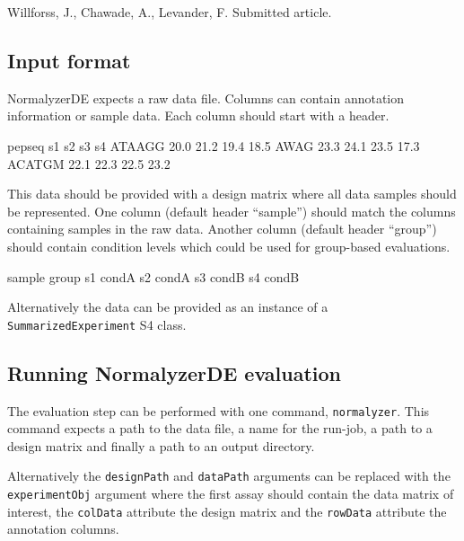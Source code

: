 \documentclass[]{article}
\renewenvironment{verbatim}{\color{codecolor}\begin{myshaded}\begin{oldverbatim}}{\end{oldverbatim}\end{myshaded}}
\begin{document}
Willforss, J., Chawade, A., Levander, F. Submitted article.

\hypertarget{input-format}{%
\subsection{Input format}\label{input-format}}

NormalyzerDE expects a raw data file. Columns can contain annotation information or sample data.
Each column should start with a header.

\begin{verbatim}
pepseq  s1      s2      s3      s4
ATAAGG  20.0    21.2    19.4    18.5
AWAG    23.3    24.1    23.5    17.3
ACATGM  22.1    22.3    22.5    23.2
\end{verbatim}

This data should be provided with a design matrix where all data samples should be represented.
One column (default header ``sample'') should match the columns containing samples in the raw data.
Another column (default header ``group'') should contain condition levels which could be used for group-based
evaluations.

\begin{verbatim}
sample  group
s1      condA
s2      condA
s3      condB
s4      condB
\end{verbatim}

Alternatively the data can be provided as an instance of a \texttt{SummarizedExperiment} S4 class.

\hypertarget{running-normalyzerde-evaluation}{%
\subsection{Running NormalyzerDE evaluation}\label{running-normalyzerde-evaluation}}

The evaluation step can be performed with one command, \texttt{normalyzer}.
This command expects a path to the data file, a name for the run-job,
a path to a design matrix and finally a path to an output directory.

Alternatively the \texttt{designPath} and \texttt{dataPath} arguments can be replaced with the \texttt{experimentObj} argument
where the first assay should contain the data matrix of interest, the \texttt{colData} attribute the design matrix
and the \texttt{rowData} attribute the annotation columns.
\end{document}
